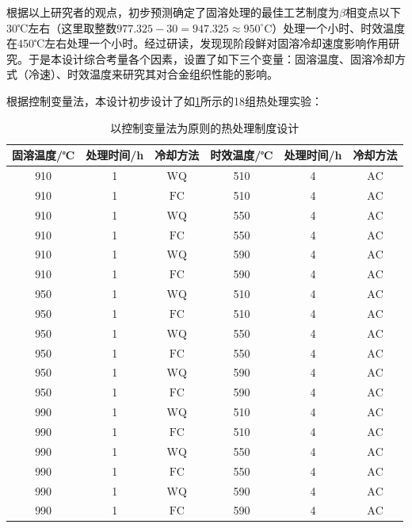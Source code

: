 根据以上研究者的观点，初步预测确定了固溶处理的最佳工艺制度为$ \beta $相变点以下30℃左右（这里取整数$ 977.325-30=947.325\approx950^{\circ} \mathrm{C} $）处理一个小时、时效温度在450℃左右处理一个小时。经过研读，发现现阶段鲜对固溶冷却速度影响作用研究。于是本设计综合考量各个因素，设置了如下三个变量：固溶温度、固溶冷却方式（冷速）、时效温度来研究其对合金组织性能的影响。

根据控制变量法，本设计初步设计了如\ref{sec:first}所示的18组热处理实验：
\begin{table}[htbp]
	\centering
	\caption{以控制变量法为原则的热处理制度设计}
	\label{sec:first}
	\begin{tabular}{cccccc}
		\toprule
		固溶温度/℃ &处理时间/h & 冷却方法 & 时效温度/℃  &处理时间/h & 冷却方法 \\
		\midrule
		910 & 1 & $\mathrm{WQ}$ & 510 & 4 & $\mathrm{AC}$\\
		910 & 1 & $\mathrm{FC}$  & 510 & 4 & $\mathrm{AC}$ \\
		910 & 1 & $\mathrm{WQ}$ & 550 & 4 & $\mathrm{AC}$ \\
		910 & 1 & $\mathrm{FC}$  & 550 & 4 & $\mathrm{AC}$ \\
		910 & 1 & $\mathrm{WQ}$ & 590 & 4 & $\mathrm{AC}$ \\
		910 & 1 & $\mathrm{FC}$  & 590 & 4 & $\mathrm{AC}$ \\
		\midrule
		950 & 1 & $\mathrm{WQ}$ & 510 & 4 & $\mathrm{AC}$ \\
		950 & 1 & $\mathrm{FC}$ & 510 & 4 & $\mathrm{AC}$ \\
		950 & 1 & $\mathrm{WQ}$ & 550 & 4 & $\mathrm{AC}$ \\
		950 & 1 & $\mathrm{FC}$ & 550 & 4 & $\mathrm{AC}$ \\
		950 & 1 & $\mathrm{WQ}$ & 590 & 4 & $\mathrm{AC}$ \\
		950 & 1 & $\mathrm{FC}$ & 590 & 4 & $\mathrm{AC}$ \\
		\midrule
		990 & 1 & $\mathrm{WQ}$ & 510 & 4 & $\mathrm{AC}$ \\
		990 & 1 & $\mathrm{FC}$ & 510 & 4 & $\mathrm{AC}$ \\
		990 & 1 & $\mathrm{WQ}$ & 550 & 4 & $\mathrm{AC}$ \\
		990 & 1 & $\mathrm{FC}$ & 550 & 4 & $\mathrm{AC}$ \\
		990 & 1 & $\mathrm{WQ}$ & 590 & 4 & $\mathrm{AC}$ \\
		990 & 1 & $\mathrm{FC}$ & 590 & 4 & $\mathrm{AC}$ \\
		\bottomrule
	\end{tabular}
\end{table}

